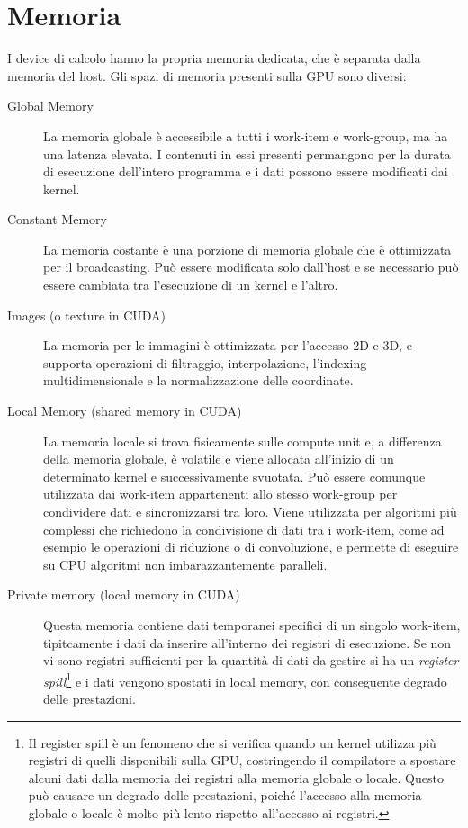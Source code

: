 \section{Memoria}
I device di calcolo hanno la propria memoria dedicata, che è separata dalla memoria del host. Gli spazi di memoria presenti sulla GPU sono diversi:
\begin{description}
    \item[Global Memory] La memoria globale è accessibile a tutti i work-item e work-group, ma ha una latenza elevata. I contenuti in essi presenti permangono per la durata di esecuzione dell'intero programma e i dati possono essere modificati dai kernel.
    \item[Constant Memory] La memoria costante è una porzione di memoria globale che è ottimizzata per il broadcasting. Può essere modificata solo dall'host e se necessario può essere cambiata tra l'esecuzione di un kernel e l'altro.
    \item[Images (o texture in CUDA)] La memoria per le immagini è ottimizzata per l'accesso 2D e 3D, e supporta operazioni di filtraggio, interpolazione,  l'indexing multidimensionale e la normalizzazione delle coordinate.
    \item[Local Memory (shared memory in CUDA)] La memoria locale si trova fisicamente sulle compute unit e, a differenza della memoria globale, è volatile e viene allocata all'inizio di un determinato kernel e successivamente svuotata. Può essere comunque utilizzata dai work-item appartenenti allo stesso work-group per condividere dati e sincronizzarsi tra loro. Viene utilizzata per algoritmi più complessi che richiedono la condivisione di dati tra i work-item, come ad esempio le operazioni di riduzione o di convoluzione, e permette di eseguire su CPU algoritmi non imbarazzantemente paralleli.
    \item[Private memory (local memory in CUDA)] Questa memoria contiene dati temporanei specifici di un singolo work-item, tipitcamente i dati da inserire all'interno dei registri di esecuzione. Se non vi sono registri sufficienti per la quantità di dati da gestire si ha un \emph{register spill}\footnote{Il register spill è un fenomeno che si verifica quando un kernel utilizza più registri di quelli disponibili sulla GPU, costringendo il compilatore a spostare alcuni dati dalla memoria dei registri alla memoria globale o locale. Questo può causare un degrado delle prestazioni, poiché l'accesso alla memoria globale o locale è molto più lento rispetto all'accesso ai registri.} e i dati vengono spostati in local memory, con conseguente degrado delle prestazioni.
\end{description}


